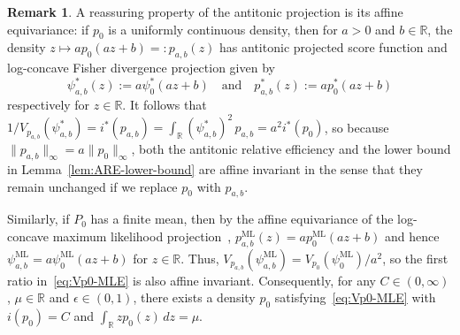 \documentclass[a4paper]{article}
\newcommand{\R}{\mathbb{R}}
\newcommand{\norm}[1]{\|{#1}\|}
\theoremstyle{definition}
\newtheorem{remark}[theorem]{Remark}
\begin{document}
\begin{remark}
\label{rem:affine-equivariance}
A reassuring property of the antitonic projection is its affine equivariance: if $p_0$ is a uniformly continuous density, then for $a > 0$ and $b \in \R$, the density $z \mapsto a p_0(az + b) =: p_{a,b}(z)$ has antitonic projected score function and log-concave Fisher divergence projection given by 
\[
\psi_{a,b}^*(z) := a \psi_0^*(az + b) \quad\text{and}\quad p_{a,b}^*(z) := a p_0^*(az + b)
\]
respectively for $z \in \R$. It follows that $1/V_{p_{a,b}}(\psi_{a,b}^*) = i^*(p_{a,b}) = \int_\R (\psi_{a,b}^*)^2\,p_{a,b} = a^2 i^*(p_0)$, so because $\norm{p_{a,b}}_\infty = a\norm{p_0}_\infty$, both the antitonic relative efficiency and the lower bound in Lemma~\ref{lem:ARE-lower-bound} are affine invariant in the sense that they remain unchanged if we replace $p_0$ with $p_{a,b}$.

Similarly, if $P_0$ has a finite mean, then by the affine equivariance of the log-concave maximum likelihood projection~\citep[Remark~2.4]{dumbgen2011approximation}, $p_{a,b}^{\mathrm{ML}}(z) = a p_0^{\mathrm{ML}}(az + b)$ and hence $\psi_{a,b}^{\mathrm{ML}} = a\psi_0^{\mathrm{ML}}(az + b)$ for $z \in \R$. Thus, $V_{p_{a,b}}(\psi_{a,b}^{\mathrm{ML}}) = V_{p_0}(\psi_0^{\mathrm{ML}})/a^2$, so the first ratio in~\eqref{eq:Vp0-MLE} is also affine invariant. Consequently, for any $C \in (0,\infty)$, $\mu \in \R$ and $\epsilon \in (0,1)$, there exists a density $p_0$ satisfying~\eqref{eq:Vp0-MLE} with $i(p_0) = C$ and $\int_\R z p_0(z)\,dz = \mu$.
\end{remark}
\end{document}
